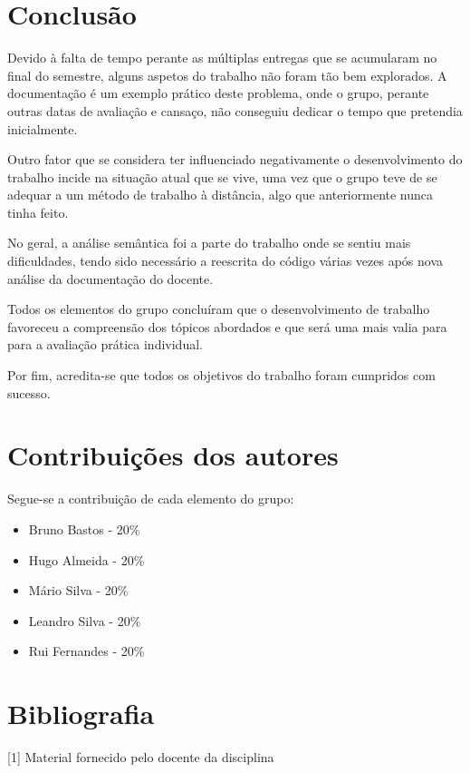 \documentclass[10pt,portuguese]{article}
\begin{document}
\clearpage

\section{Conclusão}

\par Devido à falta de tempo perante as múltiplas entregas que se acumularam no final do semestre, alguns aspetos do trabalho não foram tão bem explorados. A documentação é um exemplo prático deste problema, onde o grupo, perante outras datas de avaliação e cansaço, não conseguiu dedicar o tempo que pretendia inicialmente.

\par Outro fator que se considera ter influenciado negativamente o desenvolvimento do trabalho incide na situação atual que se vive, uma vez que o grupo teve de se adequar a um método de trabalho à distância, algo que anteriormente nunca tinha feito.

\par No geral, a análise semântica foi a parte do trabalho onde se sentiu mais dificuldades, tendo sido necessário a reescrita do código várias vezes após nova análise da documentação do docente.

\par Todos os elementos do grupo concluíram que o desenvolvimento de trabalho favoreceu a compreensão dos tópicos abordados e que será uma mais valia para para a avaliação prática individual.

\par Por fim, acredita-se que todos os objetivos do trabalho foram cumpridos com sucesso.

\section{Contribuições dos autores}
\par Segue-se a contribuição de cada elemento do grupo:
\begin{itemize}
    \item Bruno Bastos -  20\%
	\item Hugo Almeida - 20\%
	\item Mário Silva - 20\%
    \item Leandro Silva - 20\%
	\item Rui Fernandes - 20\%
\end{itemize}

\clearpage

\section{Bibliografia}





\vspace{5mm} %

[1] Material fornecido pelo docente da disciplina
\end{document}
